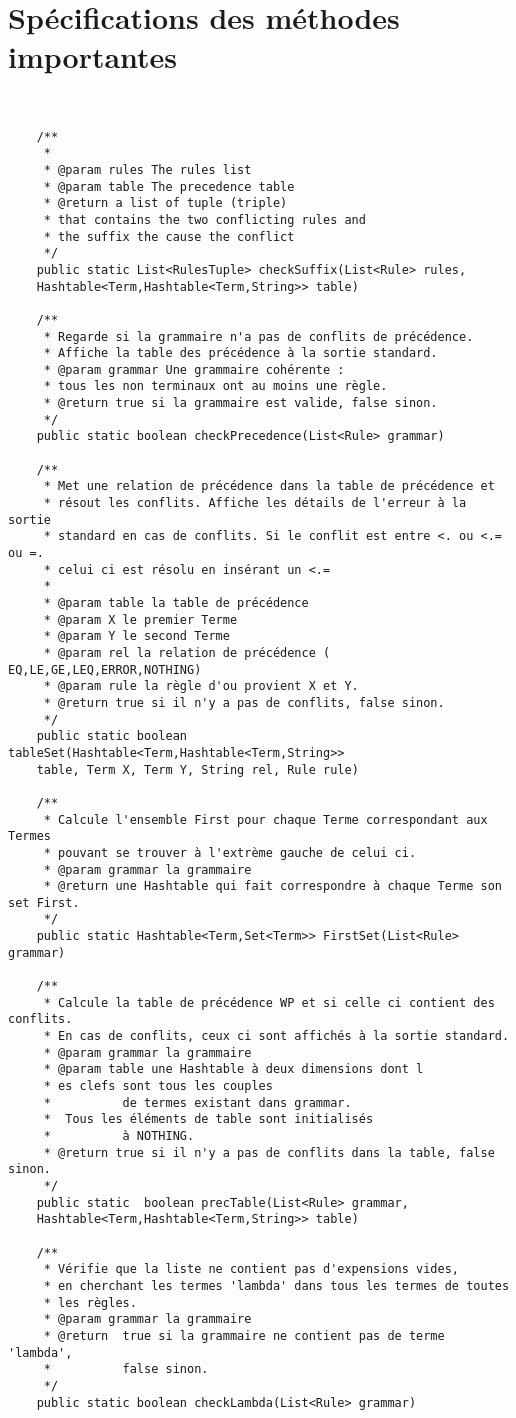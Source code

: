 	\section{Spécifications des méthodes importantes}
{\small
\begin{verbatim}


 	/**
	 * 
	 * @param rules The rules list
	 * @param table The precedence table
	 * @return a list of tuple (triple) 
	 * that contains the two conflicting rules and 
	 * the suffix the cause the conflict
	 */
	public static List<RulesTuple> checkSuffix(List<Rule> rules, 
	Hashtable<Term,Hashtable<Term,String>> table)
	
	/**
	 * Regarde si la grammaire n'a pas de conflits de précédence.
	 * Affiche la table des précédence à la sortie standard.
	 * @param grammar Une grammaire cohérente : 
	 * tous les non terminaux ont au moins une règle. 
	 * @return true si la grammaire est valide, false sinon.
	 */
	public static boolean checkPrecedence(List<Rule> grammar)
	
	/**
	 * Met une relation de précédence dans la table de précédence et
	 * résout les conflits. Affiche les détails de l'erreur à la sortie
	 * standard en cas de conflits. Si le conflit est entre <. ou <.= ou =. 
	 * celui ci est résolu en insérant un <.= 
	 * 
	 * @param table la table de précédence
	 * @param X	le premier Terme
	 * @param Y le second Terme
	 * @param rel la relation de précédence ( EQ,LE,GE,LEQ,ERROR,NOTHING)
	 * @param rule la règle d'ou provient X et Y.
	 * @return true si il n'y a pas de conflits, false sinon. 
	 */
	public static boolean tableSet(Hashtable<Term,Hashtable<Term,String>> 
	table, Term X, Term Y, String rel, Rule rule)
	
	/**
	 * Calcule l'ensemble First pour chaque Terme correspondant aux Termes
	 * pouvant se trouver à l'extrème gauche de celui ci. 
	 * @param grammar la grammaire
	 * @return une Hashtable qui fait correspondre à chaque Terme son set First.
	 */
	public static Hashtable<Term,Set<Term>> FirstSet(List<Rule> grammar)
	
	/**
	 * Calcule la table de précédence WP et si celle ci contient des conflits.
	 * En cas de conflits, ceux ci sont affichés à la sortie standard.
	 * @param grammar la grammaire
	 * @param table une Hashtable à deux dimensions dont l
	 * es clefs sont tous les couples
	 * 			de termes existant dans grammar. 
	 *  Tous les éléments de table sont initialisés
	 * 			à NOTHING.
	 * @return true si il n'y a pas de conflits dans la table, false sinon. 
	 */
	public static  boolean precTable(List<Rule> grammar, 
	Hashtable<Term,Hashtable<Term,String>> table)
	
	/**
	 * Vérifie que la liste ne contient pas d'expensions vides,
	 * en cherchant les termes 'lambda' dans tous les termes de toutes
	 * les règles. 
	 * @param grammar la grammaire
	 * @return  true si la grammaire ne contient pas de terme 'lambda',
	 * 			false sinon.
	 */
	public static boolean checkLambda(List<Rule> grammar)


\end{verbatim}
}
